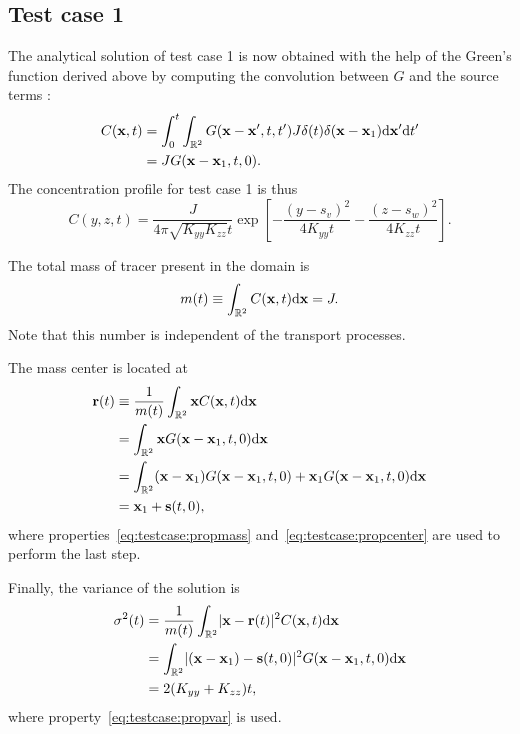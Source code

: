 \subsection{Test case 1}
The analytical solution of test case 1 is now obtained with the help of the Green's function derived above by computing the convolution between $G$ and the source terms :
\begin{align}
	C(\b x,t) &= \int_{0}^{t} \int_{\R[2]} G(\b x - \b x',t,t') J \delta(t) \delta(\b x- \b x_1) \rm d \b{x}' \rm dt'\nonumber\\
	&= J G(\b x - \b x_1,t,0).
\end{align}
The concentration profile for test case 1 is thus
\begin{equation}
	C(y,z,t) = \frac{J}{4\pi\sqrt{K_{yy}K_{zz}}t}\exp\left[-\frac{(y-s_v)^2}{4K_{yy}t} -\frac{(z-s_w)^2}{4K_{zz}t} \right].
\end{equation}

The total mass of tracer present in the domain is
\begin{equation}
	m(t) \equiv \int_{\R[2]} C(\b x,t) \rm d \b x = J.
\end{equation}
Note that this number is independent of the transport processes.

The mass center is located at
\begin{align}
	\b r(t) &\equiv \frac{1}{m(t)} \int_{\R[2]} \b x C(\b x,t) \rm d \b x \nonumber \\
	&= \int_{\R[2]} \b x G(\b x - \b x_1,t,0) \rm d \b x \nonumber\\
	&= \int_{\R[2]} (\b x-\b x_1) G(\b x - \b x_1,t,0) + \b x_1 G(\b x - \b x_1,t,0) \rm d \b x\nonumber\\
	&= \b x_1 + \b s(t,0),
\end{align}
where properties~\eqref{eq:testcase:propmass} and~\eqref{eq:testcase:propcenter} are used to perform the last step.

Finally, the variance of the solution is
\begin{align}
	\sigma^2(t) &= \frac{1}{m(t)} \int_{\R[2]} \lvert \b x - \b r(t) \rvert^2 C(\b x,t) \rm d \b x \nonumber \\
	&= \int_{\R[2]} \lvert (\b x - \b x_1) - \b s(t,0)\rvert^2 G(\b x - \b x_1,t,0) \rm d \b x \nonumber \\
	&= 2(K_{yy}+K_{zz})t,
\end{align}
where property~\eqref{eq:testcase:propvar} is used.

